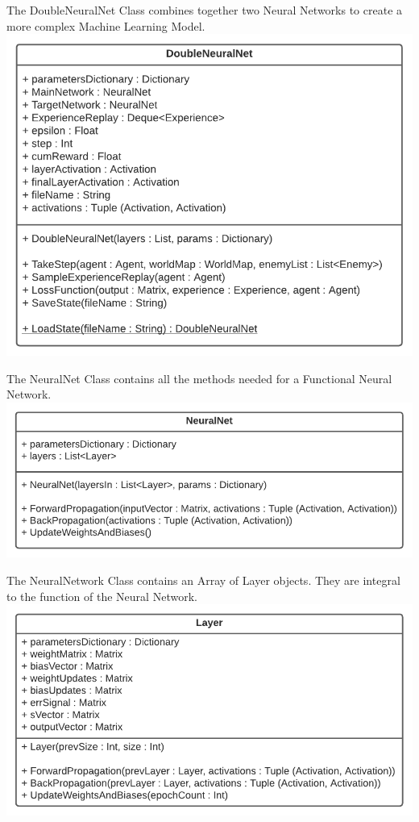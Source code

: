 \begin{flushleft}
\begin{center}
                The DoubleNeuralNet Class combines together two Neural Networks to create a more complex Machine Learning Model. \\
                \includegraphics[width=.70\textwidth]{Images/Design/Classes/DoubleNeuralNet.png} \\
                \vspace{0.2cm}

                The NeuralNet Class contains all the methods needed for a Functional Neural Network. \\
                \includegraphics[width=.80\textwidth]{Images/Design/Classes/NeuralNet.png} \\
                \vspace{0.2cm}
                
                The NeuralNetwork Class contains an Array of Layer objects. They are integral to the function of the Neural Network. \\
                \includegraphics[width=.75\textwidth]{Images/Design/Classes/Layer.png} \\
                \vspace{0.2cm}


\end{center}
\end{flushleft}

